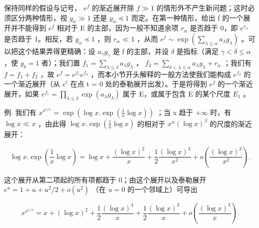 保持同样的假设与记号， \(e^{f}\) 的渐近展开除 \(f \gg 1\) 的情形外不产生新问题；这时必须区分两种情形，视 \(g_{\alpha} \gg 1\) 还是 \(g_{\alpha} \preccurlyeq 1\) 而定。在第一种情形，给出 f 的一个展开并不能得到 \(e^{f}\) 相对于 E 的主部，因为一般不知道余项 \(r_{\alpha}\) 是否趋于 0，即 \(e^{r_{\alpha}}\) 是否趋于 1。相反，若 \(g_{\alpha} \preccurlyeq 1\) ，则 \(r_{\alpha} \ll 1\) ，从而 \(e^{f} \sim \exp\left(\sum_{\lambda \leqslant \alpha} a_{\lambda} g_{\lambda}\right)\) 。可以把这个结果弄得更精确：设 \(a_{\gamma} g_{\gamma}\) 是 f 的主部，并设 \(\delta\) 是指标（满足 \(\gamma < \delta \leqslant \alpha\) ，使 \(g_{\delta} = 1\) 者）；我们置 \(f_{1} = \sum_{\lambda \leqslant \delta} a_{\lambda} g_{\lambda}\) ， \(f_{2} = \sum_{\delta < \lambda \leqslant \alpha} a_{\lambda} g_{\lambda} + r_{\alpha}\) ；我们有 \(f = f_{1} + f_{2}\) ，故 \(e^{f} = e^{f_{1}} e^{f_{2}}\) ，而本小节开头解释的一般方法使我们能构成 \(e^{f_{2}}\) 的一个渐近展开（从 \(e^{t}\) 在点 t = 0 处的泰勒展开出发）。于是将得到 \(e^{f}\) 的一个渐近展开，如果 \(e^{f_{1}} = \prod_{\lambda \leqslant \delta} \exp(a_{\lambda} g_{\lambda})\) 属于 E，或属于包含 E 的某个尺度 \(E_{1}\) 。

例. 我们有 \(x^{x^{1/x}} = \exp\left(\log x. \exp\left(\frac{1}{x} \log x\right)\right)\) ；当 x 趋于 \(+\infty\) 时，有 \(\log x \ll x\) ，由此得 \(\log x. \exp\left(\frac{1}{x} \log x\right)\) 的相对于 \(x^{\alpha}(\log x)^{\beta}\) 的尺度的渐近展开：

\[
\log x. \exp \left(\frac {1}{x} \log x\right) = \log x + \frac {(\log x) ^ {2}}{x} + \frac {1}{2} \frac {(\log x) ^ {3}}{x ^ {2}} + o \left(\frac {(\log x) ^ {3}}{x ^ {2}}\right).
\]

这个展开从第二项起的所有项都趋于 0；由这个展开以及泰勒展开 \(e^u = 1 + u + u^2 / 2 + o(u^2)\) （在 \(u = 0\) 的一个邻域上）可导出

\[
x ^ {x ^ {1 / x}} = x + (\log x) ^ {2} + \frac {1}{2} \frac {(\log x) ^ {4}}{x} + \frac {1}{2} \frac {(\log x) ^ {3}}{x} + o \left(\frac {(\log x) ^ {3}}{x}\right).
\]

